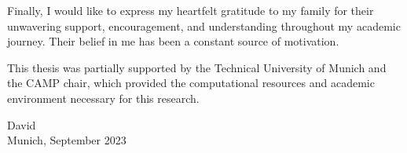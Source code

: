 Finally, I would like to express my heartfelt gratitude to my family for their unwavering support, encouragement, and understanding throughout my academic journey. Their belief in me has been a constant source of motivation.

This thesis was partially supported by the Technical University of Munich and the CAMP chair, which provided the computational resources and academic environment necessary for this research.

\vspace{1cm}
\begin{flushright}
David\\
Munich, September 2023
\end{flushright}

\cleardoublepage{}
